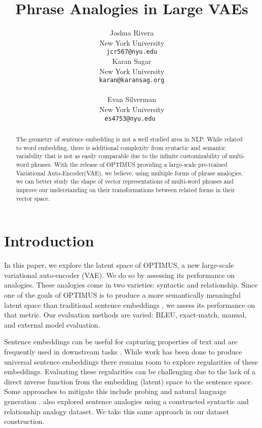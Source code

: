 \documentclass[11pt]{article}
\title{Phrase Analogies in Large VAEs}
\author{Joshua Rivera \\
  New York University\\
  \texttt{jcr567@nyu.edu} \\\And
  Karan Sagar \\
  New York University\\
  \texttt{karan@karansag.org} \\\\\And
  Evan Silverman \\
  New York University\\
  \texttt{es4753@nyu.edu } \\}
\begin{document}
\maketitle
\begin{abstract}
The geometry of sentence embedding is not a well studied area in NLP. While related to word embedding, there is additional complexity from syntactic and semantic variability that is not as easily comparable due to the infinite customizability of multi-word phrases.  With the release of OPTIMUS providing a large-scale pre-trained Variational Auto-Encoder(VAE), we believe, using multiple forms of phrase analogies, we can better study the shape of vector representations of multi-word phrases and improve our understanding on their transformations between related forms in their vector space.
\end{abstract}

\section{Introduction}






In this paper, we explore the latent space of OPTIMUS, a new large-scale variational auto-encoder (VAE). We do so by assessing its performance on analogies. These analogies come in two varieties: syntactic and relationship. Since one of the goals of OPTIMUS is to produce a more semantically meaningful latent space than traditional sentence embeddings \cite{li2020_Optimus}, we assess its performance on that metric. Our evaluation methods are varied: BLEU, exact-match, manual, and external model evaluation.  

Sentence embeddings can be useful for capturing properties of text and are frequently used in downstream tasks \cite{conneau2018cram}. While work has been done to produce universal sentence embeddings \cite{kiros2015skipthought, conneau2018supervised, cer2018universal} there remains room to explore regularities of these embeddings. Evaluating these regularities can be challenging due to the lack of a direct inverse function from the embedding (latent) space to the sentence space. Some approaches to mitigate this include probing \cite{conneau2018cram} and natural language generation \cite{kerscher2020vec2sent, Wang2020vec2sent}. \citet{zhu-de-melo-2020-sentence} also explored sentence analogies using a constructed syntactic and relationship analogy dataset. We take this same approach in our dataset construction.
\end{document}
